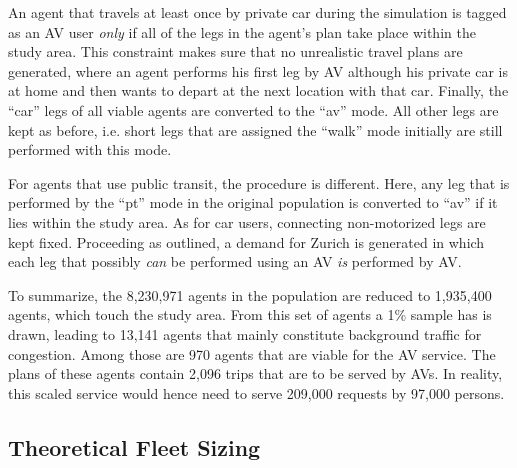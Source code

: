 
An agent that travels at least once by private car during the simulation is tagged
as an AV user \textit{only} if all of the legs in the agent's plan take place
within the study area. This constraint makes sure that no unrealistic travel
plans are generated, where an agent performs his first leg by AV although his
private car is at home and then wants to depart at the next location with that
car. Finally, the ``car'' legs of all viable agents are converted to the ``av'' mode.
All other legs are kept as before, i.e. short legs that are assigned the ``walk''
mode initially are still performed with this mode.

For agents that use public transit, the procedure is different. Here, any leg
that is performed by the ``pt'' mode in the original population is converted to ``av''
if it lies within the study area. As for car users, connecting non-motorized
legs are kept fixed. Proceeding as outlined, a demand for Zurich is generated in which each leg that possibly
\textit{can} be performed using an AV \textit{is} performed by AV.

To summarize, the 8,230,971 agents in the population are reduced to
1,935,400 agents, which touch the study area. From this set of agents
a 1\% sample has is drawn, leading to 13,141 agents that mainly constitute
background traffic for congestion. Among those are 970 agents that are viable for the AV
service. The plans of these agents contain 2,096 trips that are to be served by
AVs. In reality, this scaled service would hence need to serve 209,000 requests by
97,000 persons.

\subsection{Theoretical Fleet Sizing}


